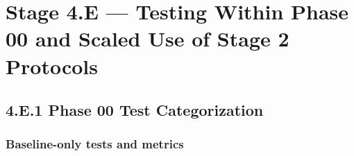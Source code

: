 \documentclass[10pt]{article}
\begin{document}
\section*{Stage 4.E — Testing Within Phase 00 and Scaled Use of Stage 2 Protocols}
{}

\subsection*{4.E.1 Phase 00 Test Categorization}
{}

\subsubsection*{Baseline-only tests and metrics}
\end{document}

